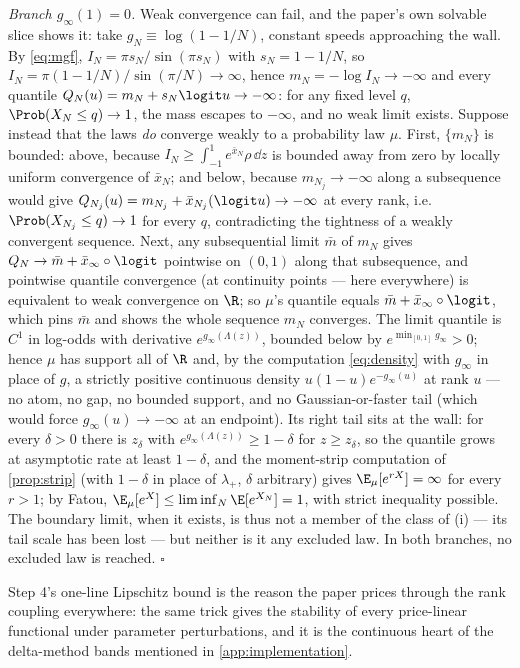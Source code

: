 \emph{Branch $g_\infty(1)=0$.}  Weak convergence can fail, and the
paper's own solvable slice shows it: take $g_N\equiv\log(1-1/N)$,
constant speeds approaching the wall.  By \eqref{eq:mgf},
$I_N=\pi s_N/\sin(\pi s_N)$ with $s_N=1-1/N$, so
$I_N=\pi(1-1/N)/\sin(\pi/N)\to\infty$, hence $m_N=-\log I_N\to-\infty$
and every quantile $Q_N(u)=m_N+s_N\logit u\to-\infty$: for any fixed
level $q$, $\Prob(X_N\le q)\to1$, the mass escapes to $-\infty$, and no
weak limit exists.  Suppose instead that the laws \emph{do} converge
weakly to a probability law $\mu$.  First, $\{m_N\}$ is bounded: above,
because $I_N\ge\int_{-1}^{1}e^{\bar x_N}\rho\,\dd z$ is bounded away
from zero by locally uniform convergence of $\bar x_N$; and below,
because $m_{N_j}\to-\infty$ along a subsequence would give
$Q_{N_j}(u)=m_{N_j}+\bar x_{N_j}(\logit u)\to-\infty$ at every rank,
i.e.\ $\Prob(X_{N_j}\le q)\to1$ for every $q$, contradicting the
tightness of a weakly convergent sequence.  Next, any subsequential
limit $\bar m$ of $m_N$ gives $Q_N\to\bar m+\bar x_\infty\circ\logit$
pointwise on $(0,1)$ along that subsequence, and pointwise quantile
convergence (at continuity points --- here everywhere) is equivalent to
weak convergence on $\R$; so $\mu$'s quantile equals
$\bar m+\bar x_\infty\circ\logit$, which pins $\bar m$ and shows the
whole sequence $m_N$ converges.  The limit quantile is $C^{1}$ in
log-odds with derivative $e^{g_\infty(\Lambda(z))}$, bounded below by
$e^{\min_{[0,1]}g_\infty}>0$; hence $\mu$ has support all of $\R$ and,
by the computation \eqref{eq:density} with $g_\infty$ in place of $g$,
a strictly positive continuous density $u(1-u)e^{-g_\infty(u)}$ at rank
$u$ --- no atom, no gap, no bounded support, and no Gaussian-or-faster
tail (which would force $g_\infty(u)\to-\infty$ at an endpoint).  Its
right tail sits at the wall: for every $\delta>0$ there is $z_\delta$
with $e^{g_\infty(\Lambda(z))}\ge1-\delta$ for $z\ge z_\delta$, so the
quantile grows at asymptotic rate at least $1-\delta$, and the
moment-strip computation of \cref{prop:strip} (with $1-\delta$ in place
of $\lambda_+$, $\delta$ arbitrary) gives $\E_\mu[e^{rX}]=\infty$ for
every $r>1$; by Fatou, $\E_\mu[e^{X}]\le\liminf_N\E[e^{X_N}]=1$, with
strict inequality possible.  The boundary limit, when it exists, is
thus not a member of the class of (i) --- its tail scale has been lost
--- but neither is it any excluded law.  In both branches, no excluded
law is reached. \hfill$\square$

\begin{remark}
Step 4's one-line Lipschitz bound is the reason the paper prices
through the rank coupling everywhere: the same trick gives the
stability of every price-linear functional under parameter
perturbations, and it is the continuous heart of the delta-method
bands mentioned in \cref{app:implementation}.
\end{remark}
